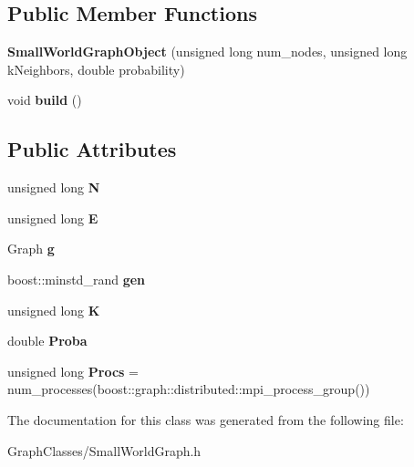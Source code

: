 \subsection*{Public Member Functions}
\begin{DoxyCompactItemize}
\item 
\mbox{\label{classSmallWorldGraphObject_a3cd1132183588dfffba4b6892264f7c9}} 
{\bfseries Small\+World\+Graph\+Object} (unsigned long num\+\_\+nodes, unsigned long k\+Neighbors, double probability)
\item 
\mbox{\label{classSmallWorldGraphObject_a88b6e629b8058a219a75b1a3eb3ace78}} 
void {\bfseries build} ()
\end{DoxyCompactItemize}
\subsection*{Public Attributes}
\begin{DoxyCompactItemize}
\item 
\mbox{\label{classSmallWorldGraphObject_ac71676e3d70169b86efe9eb8026f22dd}} 
unsigned long {\bfseries N}
\item 
\mbox{\label{classSmallWorldGraphObject_ae8743f503dc950297bddc0fe0d479d01}} 
unsigned long {\bfseries E}
\item 
\mbox{\label{classSmallWorldGraphObject_a93c81ac9467a03d50acf4f652300ee21}} 
Graph {\bfseries g}
\item 
\mbox{\label{classSmallWorldGraphObject_a2cdff89afdd0a03423557ddb4cb61791}} 
boost\+::minstd\+\_\+rand {\bfseries gen}
\item 
\mbox{\label{classSmallWorldGraphObject_a064764c41a03f67791e76d5b957facc0}} 
unsigned long {\bfseries K}
\item 
\mbox{\label{classSmallWorldGraphObject_adf39fde9b34c52489a0606c71f071c21}} 
double {\bfseries Proba}
\item 
\mbox{\label{classSmallWorldGraphObject_acd7c02cb7511fe6cd844c10457ff4707}} 
unsigned long {\bfseries Procs} = num\+\_\+processes(boost\+::graph\+::distributed\+::mpi\+\_\+process\+\_\+group())
\end{DoxyCompactItemize}


The documentation for this class was generated from the following file\+:\begin{DoxyCompactItemize}
\item 
Graph\+Classes/Small\+World\+Graph.\+h\end{DoxyCompactItemize}
